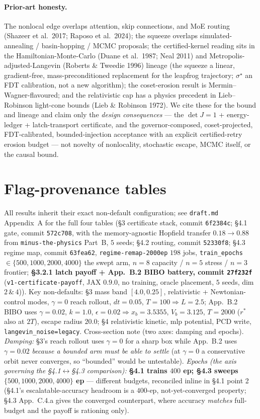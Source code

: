 \documentclass[11pt]{article}
\newcommand{\detJ}{\det J}
\begin{document}
\paragraph{Prior-art honesty.} The nonlocal edge overlaps attention, skip connections, and MoE routing (Shazeer et al.\ 2017; Raposo et al.\ 2024); the squeeze overlaps simulated-annealing / basin-hopping / MCMC proposals; the certified-kernel reading sits in the Hamiltonian-Monte-Carlo (Duane et al.\ 1987; Neal 2011) and Metropolis-adjusted-Langevin (Roberts \& Tweedie 1996) lineage (the squeeze a linear, gradient-free, mass-preconditioned replacement for the leapfrog trajectory; $\sigma^\star$ an FDT calibration, not a new algorithm); the coset-erosion result is Mermin--Wagner-flavoured; and the relativistic cap has a physics precedent in Lieb--Robinson light-cone bounds (Lieb \& Robinson 1972). We cite these for the bound and lineage and claim only the \emph{design consequences} --- the $\detJ=1$ + energy-ledger + latch-transport certificate, and the governor-composed, coset-projected, FDT-calibrated, bounded-injection acceptance with an explicit certified-retry erosion budget --- not novelty of nonlocality, stochastic escape, MCMC itself, or the causal bound.

\appendix
\section{Flag-provenance tables}
All results inherit their exact non-default configuration; see \texttt{draft.md} Appendix~A for the full four tables (\S3 certificate stack, commit \texttt{6f2384c}; \S4.1 gate, commit \texttt{572c708}, with the memory-agnostic Hopfield transfer $0.18\to0.88$ from \texttt{minus-the-physics} Part~B, $5$ seeds; \S4.2 routing, commit \texttt{52330f8}; \S4.3 regime map, commit \texttt{63fea62}, \texttt{regime-remap-2000ep} $198$ jobs, \texttt{train\_epochs}$\in\{500,1000,2000,4000\}$ the swept arm, $n{=}8$ capacity / $n{=}5$ stress / $n{=}3$ frontier; \textbf{\S3.2.1 latch payoff + App.~B.2 BIBO battery, commit \texttt{27f232f}} (\texttt{v1-certificate-payoff}, JAX $0.9.0$, no training, oracle placement, $5$ seeds, dim $2$\,\&\,$4$)). Key non-defaults: \S3 mass band $[4.0,0.25]$, relativistic + Newtonian-control modes, $\gamma=0$ reach rollout, $dt=0.05$, $T=100\Rightarrow L=2.5$; App.~B.2 BIBO uses $\gamma=0.02$, $k=1.0$, $\epsilon=0.02\Rightarrow x_b=3.5355$, $V_b=3.125$, $T=2000$ ($r^\ast$ also at $2T$), escape radius $20.0$; \S4 relativistic kinetic, mlp potential, PCD write, \texttt{langevin\_noise=legacy}. Cross-section note (two axes: damping and epochs). \emph{Damping:} \S3's reach rollout uses $\gamma=0$ for a sharp box while App.~B.2 uses $\gamma=0.02$ \emph{because a bounded arm must be able to settle} (at $\gamma=0$ a conservative orbit never converges, so ``bounded'' would be untestable). \emph{Epochs (the axis governing the \S4.1$\leftrightarrow$\S4.3 comparison):} \textbf{\S4.1 trains $400$ ep; \S4.3 sweeps $\{500,1000,2000,4000\}$ ep} --- different budgets, reconciled inline in \S4.1 point 2 (\S4.1's escalatable-accuracy headroom is a $400$-ep, not-yet-converged property; \S4.3 App.~C.4.a gives the converged counterpart, where accuracy \emph{matches} full-budget and the payoff is rationing only).
\end{document}
